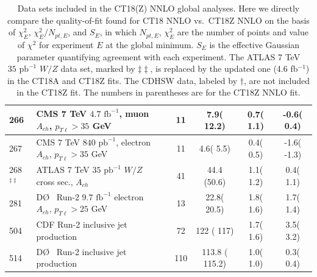 \begin{table}[htbp]
\begin{tabular}{|l|lr|c|c|c|c|}
 266 & CMS 7 TeV $4.7\mbox{ fb}^{-1}$, muon $A_{ch}$, $p_{T\ell}>35$ GeV                   & \cite{Chatrchyan:2013mza}   &   11  &     7.9(  12.2) &   0.7( 1.1) &  -0.6(  0.4)   \tabularnewline\hline
 267 & CMS 7 TeV $840\mbox{ pb}^{-1}$, electron $A_{ch}$, $p_{T\ell}>35$ GeV               & \cite{Chatrchyan:2012xt}    &   11  &    4.6(  5.5) &   0.4( 0.5) &   -1.6(  -1.3)   \tabularnewline\hline
 268$^{\ddagger\ddagger}$ & ATLAS 7 TeV $35\mbox{ pb}^{-1}$ $W/Z$ cross sec., $A_{ch}$                          & \cite{Aad:2011dm}           &   41  &    44.4   (50.6) &   1.1( 1.2) &   0.4(  1.1)   \tabularnewline\hline
 281 & D\O~ Run-2 $9.7 \mbox{ fb}^{-1}$ electron $A_{ch}$, $p_{T\ell}>25$ GeV              & \cite{D0:2014kma}           &   13  &    22.8(  20.5) &   1.8( 1.6) &   1.7(  1.4)   \tabularnewline\hline
 504 & CDF Run-2 inclusive jet production                                                  & \cite{Aaltonen:2008eq}      &   72  &   122 ( 117) &   1.7( 1.6) &   3.5(  3.2)   \tabularnewline\hline
 514 & D\O~ Run-2 inclusive jet production                                                 & \cite{Abazov:2008ae}        &  110  &   113.8 ( 115.2) &   1.0( 1.0) &   0.3(  0.4)   \tabularnewline
\hline
\hline
\end{tabular}
\caption{Data sets included in the CT18(Z) NNLO global analyses. Here we directly compare the quality-of-fit found for CT18 NNLO vs.~CT18Z NNLO on the basis of $\chi^2_E$,
	$\chi^2_E/N_{pt, E}$, and $S_E$, in which $N_{pt, E}$, $\chi^2_E$ are the number of points and value of $\chi^2$ for  experiment  $E$ at the global minimum. $S_E$ is
	the effective Gaussian parameter \cite{Lai:2010vv, Gao:2013xoa, Dulat:2013hea} quantifying agreement with each experiment. The ATLAS 7 TeV $35\mbox{ pb}^{-1}$ $W/Z$ data set, marked by $\ddagger\ddagger$, is replaced by the updated one (4.6 fb$^{-1}$) in the CT18A and CT18Z fits. The CDHSW data, labeled by $\dagger$, are not included in the CT18Z fit. The numbers in parentheses are for the CT18Z NNLO fit.
\label{tab:EXP_1} }
\end{table}
\endgroup



\begingroup

